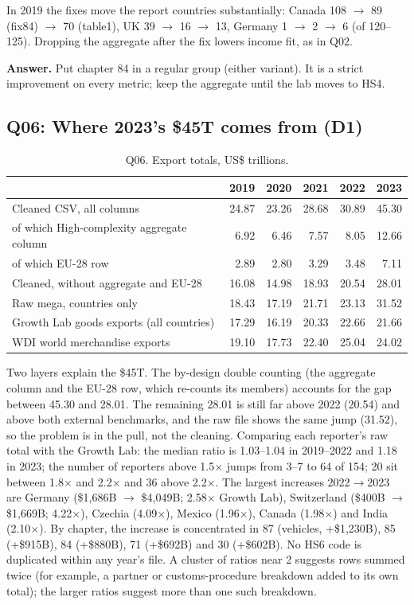 \documentclass[11pt]{article}
\begin{document}
In 2019 the fixes move the report countries substantially: Canada 108 $\rightarrow$ 89 (fix84) $\rightarrow$ 70 (table1), UK 39 $\rightarrow$ 16 $\rightarrow$ 13, Germany 1 $\rightarrow$ 2 $\rightarrow$ 6 (of 120--125). Dropping the aggregate after the fix lowers income fit, as in Q02.

\textbf{Answer.} Put chapter 84 in a regular group (either variant). It is a strict improvement on every metric; keep the aggregate until the lab moves to HS4.

\subsection{Q06: Where 2023's \$45T comes from (D1)}\label{sec:q06}

\begin{table}[H]\centering\small
\caption{Q06. Export totals, US\$ trillions.}\label{tab:q06}
\begin{tabular}{lrrrrr}
\toprule
 & 2019 & 2020 & 2021 & 2022 & 2023 \\
\midrule
Cleaned CSV, all columns & 24.87 & 23.26 & 28.68 & 30.89 & 45.30 \\
\quad of which High-complexity aggregate column & 6.92 & 6.46 & 7.57 & 8.05 & 12.66 \\
\quad of which EU-28 row & 2.89 & 2.80 & 3.29 & 3.48 & 7.11 \\
Cleaned, without aggregate and EU-28 & 16.08 & 14.98 & 18.93 & 20.54 & 28.01 \\
Raw mega, countries only & 18.43 & 17.19 & 21.71 & 23.13 & 31.52 \\
Growth Lab goods exports (all countries) & 17.29 & 16.19 & 20.33 & 22.66 & 21.66 \\
WDI world merchandise exports & 19.10 & 17.73 & 22.40 & 25.04 & 24.02 \\
\bottomrule
\end{tabular}
\end{table}

Two layers explain the \$45T. The by-design double counting (the aggregate column and the EU-28 row, which re-counts its members) accounts for the gap between 45.30 and 28.01. The remaining 28.01 is still far above 2022 (20.54) and above both external benchmarks, and the raw file shows the same jump (31.52), so the problem is in the pull, not the cleaning. Comparing each reporter's raw total with the Growth Lab: the median ratio is 1.03--1.04 in 2019--2022 and 1.18 in 2023; the number of reporters above 1.5$\times$ jumps from 3--7 to 64 of 154; 20 sit between 1.8$\times$ and 2.2$\times$ and 36 above 2.2$\times$. The largest increases 2022$\rightarrow$2023 are Germany (\$1,686B $\rightarrow$ \$4,049B; 2.58$\times$ Growth Lab), Switzerland (\$400B $\rightarrow$ \$1,669B; 4.22$\times$), Czechia (4.09$\times$), Mexico (1.96$\times$), Canada (1.98$\times$) and India (2.10$\times$). By chapter, the increase is concentrated in 87 (vehicles, +\$1,230B), 85 (+\$915B), 84 (+\$880B), 71 (+\$692B) and 30 (+\$602B). No HS6 code is duplicated within any year's file. A cluster of ratios near 2 suggests rows summed twice (for example, a partner or customs-procedure breakdown added to its own total); the larger ratios suggest more than one such breakdown.
\end{document}
